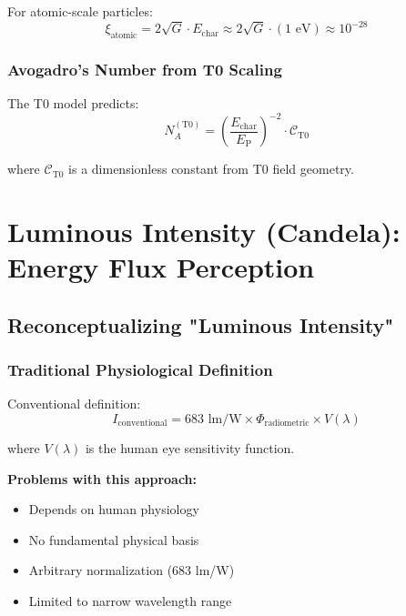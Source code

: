 \documentclass[12pt,a4paper]{article}
\newcommand{\xipar}{\xi}
\newcommand{\EP}{E_{\text{P}}}
\newcommand{\Echar}{E_{\text{char}}}
\begin{document}
	For atomic-scale particles:
	\begin{equation}
		\xipar_{\text{atomic}} = 2\sqrt{G} \cdot \Echar \approx 2\sqrt{G} \cdot (1 \text{ eV}) \approx 10^{-28}
		\label{eq:xi_atomic}
	\end{equation}
	
	\subsubsection{Avogadro's Number from T0 Scaling}
	\label{subsubsec:avogadro_t0}
	
	The T0 model predicts:
	\begin{equation}
		N_A^{(\text{T0})} = \left(\frac{\Echar}{\EP}\right)^{-2} \cdot \mathcal{C}_{\text{T0}}
		\label{eq:avogadro_t0_prediction}
	\end{equation}
	
	where $\mathcal{C}_{\text{T0}}$ is a dimensionless constant from T0 field geometry.
	
	\section{Luminous Intensity (Candela): Energy Flux Perception}
	\label{sec:candela_derivation}
	
	\subsection{Reconceptualizing "Luminous Intensity"}
	\label{subsec:reconceptualizing_luminosity}
	
	\subsubsection{Traditional Physiological Definition}
	\label{subsubsec:traditional_luminosity}
	
	Conventional definition:
	\begin{equation}
		I_{\text{conventional}} = 683 \text{ lm/W} \times \Phi_{\text{radiometric}} \times V(\lambda)
		\label{eq:conventional_candela}
	\end{equation}
	
	where $V(\lambda)$ is the human eye sensitivity function.
	
	\textbf{Problems with this approach:}
	\begin{itemize}
		\item Depends on human physiology
		\item No fundamental physical basis
		\item Arbitrary normalization (683 lm/W)
		\item Limited to narrow wavelength range
	\end{itemize}
	
\end{document}
